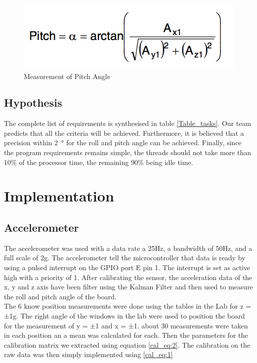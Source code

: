 \documentclass[12pt]{article}
\begin{document}
\begin{figure}[!htb]
 \centering
 \includegraphics[scale=0.50]{images/pitch.png}
 \caption{Measurement of Pitch Angle}
 \label{fig:pitch}
\end{figure}

\subsection{Hypothesis}
The complete list of requirements is synthesised in table \ref{Table_tasks}. Our team predicts that all the criteria will be achieved. Furthermore, it is believed that a precision within \SI{2}{\degree} for the roll and pitch angle can be achieved. Finally, since the program requirements remains simple, the threads should not take more than 10\% of the processor time, the remaining 90\% being idle time.

\section{Implementation}
\subsection{Accelerometer}
The accelerometer was used with a data rate a 25Hz, a bandwidth of 50Hz, and a full scale of 2g. The accelerometer tell the microcontroller that data is ready by using a pulsed interrupt on the GPIO port E pin 1. The interrupt is set as active high with a priority of 1. After calibrating the sensor, the acceleration data of the x, y and z axis have been filter using the Kalman Filter and then used to measure the roll and pitch angle of the board. \\

The 6 know position measurements were done using the tables in the Lab for z = ±1g. The right angle of the windows in the lab were used to position the board for the measurement of y = ±1 and x = ±1. about 30 measurements were taken in each position an a mean was calculated for each. Then the parameters for the calibration matrix we extracted using equation \ref{cal_eq:2}. The calibration on the raw data was then simply implemented using \ref{cal_eq:1}
\end{document}
